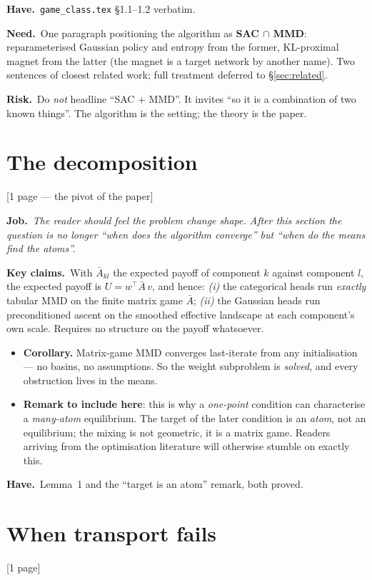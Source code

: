 \documentclass[11pt]{article}
\newcommand{\job}[1]{\par\smallskip\noindent
  \textcolor{jobc}{\textbf{Job.}}\ \emph{#1}\par\smallskip}
\newcommand{\says}[1]{\par\noindent\textbf{Key claims.}\ #1\par\smallskip}
\newcommand{\have}[1]{\par\noindent
  \textcolor{havec}{\textbf{Have.}}\ #1\par}
\newcommand{\need}[1]{\par\noindent
  \textcolor{needc}{\textbf{Need.}}\ #1\par}
\newcommand{\risk}[1]{\par\noindent
  \textcolor{riskc}{\textbf{Risk.}}\ #1\par\smallskip}
\newcommand{\budget}[1]{\hfill{\small\textsf{[#1]}}}
\theoremstyle{definition}
\theoremstyle{remark}
\begin{document}
\have{\texttt{game\_class.tex} \S1.1--1.2 verbatim.}

\need{One paragraph positioning the algorithm as \textbf{SAC $\cap$ MMD}:
reparameterised Gaussian policy and entropy from the former, KL-proximal magnet
from the latter (the magnet is a target network by another name). Two sentences
of closest related work; full treatment deferred to \S\ref{sec:related}.}

\risk{Do \emph{not} headline ``SAC + MMD''. It invites ``so it is a combination
of two known things''. The algorithm is the setting; the theory is the paper.}

\section{The decomposition}\label{sec:decomp}
\budget{1 page --- the pivot of the paper}

\job{The reader should feel the problem change shape. After this section the
question is no longer ``when does the algorithm converge'' but ``when do the
means find the atoms''.}

\says{With $\bar A_{kl}$ the expected payoff of component $k$ against component
$l$, the expected payoff is $U = w^\top \bar A\, v$, and hence:
\emph{(i)} the categorical heads run \emph{exactly} tabular MMD on the finite
matrix game $\bar A$; \emph{(ii)} the Gaussian heads run preconditioned ascent on
the smoothed effective landscape at each component's own scale. Requires no
structure on the payoff whatsoever.}

\begin{itemize}[leftmargin=1.2em]
\item \textbf{Corollary.} Matrix-game MMD converges last-iterate from any
  initialisation --- no basins, no assumptions. So the weight subproblem is
  \emph{solved}, and every obstruction lives in the means.
\item \textbf{Remark to include here}: this is why a \emph{one-point} condition
  can characterise a \emph{many-atom} equilibrium. The target of the later
  condition is an \emph{atom}, not an equilibrium; the mixing is not geometric,
  it is a matrix game. Readers arriving from the optimisation literature will
  otherwise stumble on exactly this.
\end{itemize}

\have{Lemma~1 and the ``target is an atom'' remark, both proved.}

\section{When transport fails}\label{sec:fail}
\budget{1 page}
\end{document}
